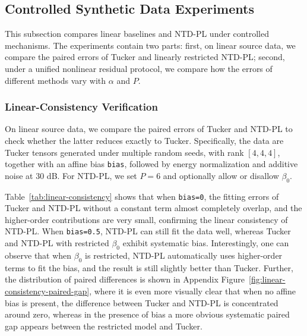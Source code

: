 \subsection{Controlled Synthetic Data Experiments}
\label{sec:exp-syn}

This subsection compares linear baselines and NTD-PL under controlled mechanisms. The experiments contain two parts: first, on linear source data, we compare the paired errors of Tucker and linearly restricted NTD-PL; second, under a unified nonlinear residual protocol, we compare how the errors of different methods vary with $\alpha$ and $P$.

\subsubsection{Linear-Consistency Verification}
\label{sec:linear-consistency}

On linear source data, we compare the paired errors of Tucker and NTD-PL to check whether the latter reduces exactly to Tucker. Specifically, the data are Tucker tensors generated under multiple random seeds, with rank $[4,4,4]$, together with an affine bias \texttt{bias}, followed by energy normalization and additive noise at $30$ dB. For NTD-PL, we set $P=6$ and optionally allow or disallow $\beta_0$.

Table~\ref{tab:linear-consistency} shows that when \texttt{bias=0}, the fitting errors of Tucker and NTD-PL without a constant term almost completely overlap, and the higher-order contributions are very small, confirming the linear consistency of NTD-PL. When \texttt{bias=0.5}, NTD-PL can still fit the data well, whereas Tucker and NTD-PL with restricted $\beta_0$ exhibit systematic bias. Interestingly, one can observe that when $\beta_0$ is restricted, NTD-PL automatically uses higher-order terms to fit the bias, and the result is still slightly better than Tucker. Further, the distribution of paired differences is shown in Appendix Figure~\ref{fig:linear-consistency-paired-gap}, where it is even more visually clear that when no affine bias is present, the difference between Tucker and NTD-PL is concentrated around zero, whereas in the presence of bias a more obvious systematic paired gap appears between the restricted model and Tucker.

\begin{table}[htbp]
    \centering
    \caption{Comparison of Tucker and NTD-PL on purely linear source data, used to verify the linear consistency of NTD-PL.}
    \label{tab:linear-consistency}
    \small
    \resizebox{\linewidth}{!}{%
    }
\end{table}

